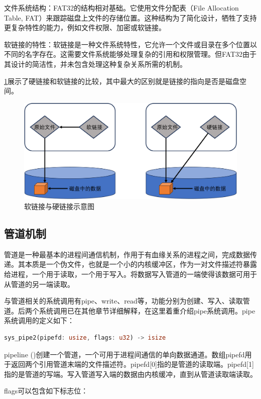 文件系统结构：FAT32的结构相对基础。它使用文件分配表（File Allocation Table, FAT）来跟踪磁盘上文件的存储位置。这种结构为了简化设计，牺牲了支持更复杂特性的能力，例如文件权限、加密或软链接。

软链接的特性：软链接是一种文件系统特性，它允许一个文件或目录在多个位置以不同的名字存在。这需要文件系统能够处理复杂的引用和权限管理。但FAT32由于其设计的简洁性，并未包含处理这种复杂关系所需的机制。

\ref{fig:link}展示了硬链接和软链接的比较，其中最大的区别就是链接的指向是否是磁盘空间。

\begin{figure}[htb]
    \centering
    \includegraphics[width=\textwidth]{figures/07-09-软连接与硬连接示意图.png}
    \caption{
        软链接与硬链接示意图
    }
    \label{fig:link}
\end{figure}
\subsection{管道机制}
管道是一种最基本的进程间通信机制，作用于有血缘关系的进程之间，完成数据传递。其本质是一个伪文件，也就是一个小的内核缓冲区，作为一对文件描述符暴露给进程，一个用于读取，一个用于写入。将数据写入管道的一端使得该数据可用于从管道的另一端读取。

与管道相关的系统调用有pipe、write、read等，功能分别为创建、写入、读取管道。后两个系统调用已在其他章节详细解释，在这里着重介绍pipe系统调用。pipe系统调用的定义如下：
\begin{lstlisting}[language=rust]
    sys_pipe2(pipefd: usize, flags: u32) -> isize
\end{lstlisting}

pipeline ()创建一个管道，一个可用于进程间通信的单向数据通道。数组pipefd用于返回两个引用管道末端的文件描述符。pipefd[0]指的是管道的读取端。pipefd[1]指的是管道的写端。写入管道写入端的数据由内核缓冲，直到从管道读取端读取。

flags可以包含如下标志位：

